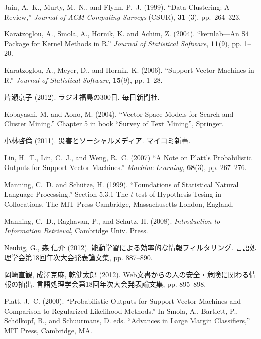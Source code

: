\documentclass[japanese]{jnlp_1.4}
\begin{document}
\begin{thebibliography}{}
\item
Jain, A.~K., Murty, M.~N., and Flynn, P.~J. (1999). ``Data Clustering: A Review,'' \textit{Journal of ACM Computing Surveys} (CSUR), \textbf{31} (3), pp.~264--323.

\item
Karatzoglou, A., Smola, A., Hornik, K. and Achim, Z. (2004). 
``kernlab---An S4 Package for Kernel Methods in R.'' \textit{Journal of Statistical 
Software}, \textbf{11}(9), pp. 1--20.

\item
Karatzoglou, A., Meyer, D., and Hornik, K. (2006). ``Support Vector 
Machines in R.'' \textit{Journal of Statistical Software}, \textbf{15}(9), pp. 1--28.

\item 
片瀬京子 (2012). ラジオ福島の300日. 毎日新聞社.

\item
Kobayashi, M. and Aono, M. (2004). ``Vector Space Models for Search and 
Cluster Mining.'' Chapter 5 in book ``Survey of Text Mining'', Springer.

\item 
小林啓倫 (2011). 災害とソーシャルメディア. マイコミ新書.

\item
Lin, H.~T., Lin, C.~J., and Weng, R.~C. (2007) ``A Note on Platt's 
Probabilistic Outputs for Support Vector Machines.'' \textit{Machine Learning}, \textbf{68}(3), 
pp. 267--276.

\item
Manning, C.~D. and Sch\"{u}tze, H. (1999). ``Foundations of 
Statistical Natural Language Processing.'' Section 5.3.1 The $t$ test of 
Hypothesis Tesing in Collocations, The MIT Press Cambridge, Massachusetts 
London, England.

\item
Manning, C.~D., Raghavan, P., and Schutz, H. (2008). 
\textit{Introduction to Information Retrieval}, Cambridge Univ. Press.

\item
Neubig, G., 森 信介 (2012). 能動学習による効率的な情報フィルタリング. 
言語処理学会第18回年次大会発表論文集, pp. 887--890.

\item 
岡崎直観, 成澤克麻, 乾健太郎 (2012). 
Web文書からの人の安全・危険に関わる情報の抽出. 言語処理学会第18回年次大会発表論文集, pp. 895--898.

\item
Platt, J.~C. (2000). ``Probabilistic Outputs for Support Vector Machines and 
Comparison to
Regularized Likelihood Methods.'' In Smola, A., Bartlett, P., Sch\"{o}lkopf, B., and Schuurmans, D. 
eds. ``Advances in Large Margin Classifiers,'' MIT Press, Cambridge, MA.


\end{thebibliography}
\end{document}
